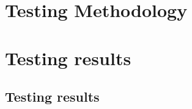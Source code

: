 \documentclass[a4paper,11pt]{article}
\begin{document}
\section{Testing Methodology}

\section{Testing results}

{}


\begin{appendices}
\section{Testing results}

\end{appendices}
\end{document}
